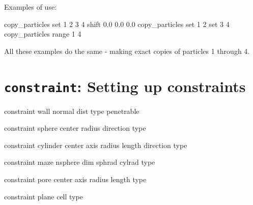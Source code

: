 Examples of use:\\
\begin{tclcode}
  copy_particles set {1 2 3 4} shift 0.0 0.0 0.0
  copy_particles set {1 2} set {3 4}
  copy_particles range 1 4
\end{tclcode}
All these examples do the same - making exact copies of particles 1 through 4.

\section{\texttt{constraint}: Setting up constraints}\label{sec:constraint}

\begin{essyntax}
  constraint wall normal    
  dist  type  penetrable 
  
  constraint sphere center    
  radius  direction  type   
  
  constraint cylinder center    
  axis    
  radius  length  
  direction  
  type   
  
  constraint maze nsphere  
  dim  sphrad  cylrad 
  type  
  
  constraint pore center    
  axis    
  radius  length  
  type  
  
  
  
  
  constraint plane cell    
  type 

  \begin{features}
  \end{features}
\end{essyntax}

